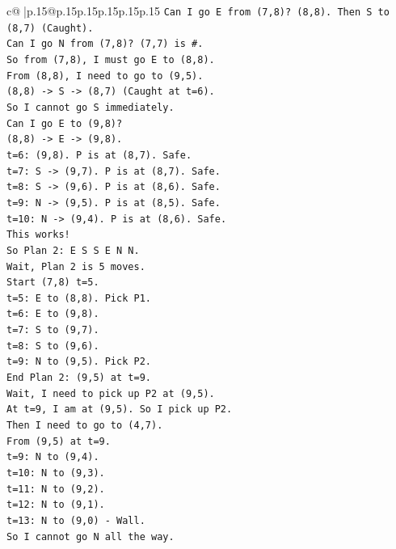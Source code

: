 \documentclass{article}
\begin{document}
{\begin{supertabular}{c@{$\;$}|p{.15\linewidth}@{}p{.15\linewidth}p{.15\linewidth}p{.15\linewidth}p{.15\linewidth}p{.15\linewidth}}
{{{\texttt{Can I go E from (7,8)? (8,8). Then S to (8,7) (Caught).} \\
\texttt{Can I go N from (7,8)? (7,7) is \#.} \\
\texttt{So from (7,8), I must go E to (8,8).} \\
\texttt{From (8,8), I need to go to (9,5).} \\
\texttt{(8,8) {-}> S {-}> (8,7) (Caught at t=6).} \\
\texttt{So I cannot go S immediately.} \\
\texttt{Can I go E to (9,8)?} \\
\texttt{(8,8) {-}> E {-}> (9,8).} \\
\texttt{t=6: (9,8). P is at (8,7). Safe.} \\
\texttt{t=7: S {-}> (9,7). P is at (8,7). Safe.} \\
\texttt{t=8: S {-}> (9,6). P is at (8,6). Safe.} \\
\texttt{t=9: N {-}> (9,5). P is at (8,5). Safe.} \\
\texttt{t=10: N {-}> (9,4). P is at (8,6). Safe.} \\
\texttt{This works!} \\
\texttt{So Plan 2: E S S E N N.} \\
\texttt{Wait, Plan 2 is 5 moves.} \\
\texttt{Start (7,8) t=5.} \\
\texttt{t=5: E to (8,8). Pick P1.} \\
\texttt{t=6: E to (9,8).} \\
\texttt{t=7: S to (9,7).} \\
\texttt{t=8: S to (9,6).} \\
\texttt{t=9: N to (9,5). Pick P2.} \\
\texttt{End Plan 2: (9,5) at t=9.} \\
\texttt{Wait, I need to pick up P2 at (9,5).} \\
\texttt{At t=9, I am at (9,5). So I pick up P2.} \\
\texttt{Then I need to go to (4,7).} \\
\texttt{From (9,5) at t=9.} \\
\texttt{t=9: N to (9,4).} \\
\texttt{t=10: N to (9,3).} \\
\texttt{t=11: N to (9,2).} \\
\texttt{t=12: N to (9,1).} \\
\texttt{t=13: N to (9,0) {-} Wall.} \\
\texttt{So I cannot go N all the way.} \\
}}}
\end{supertabular}}
\end{document}
